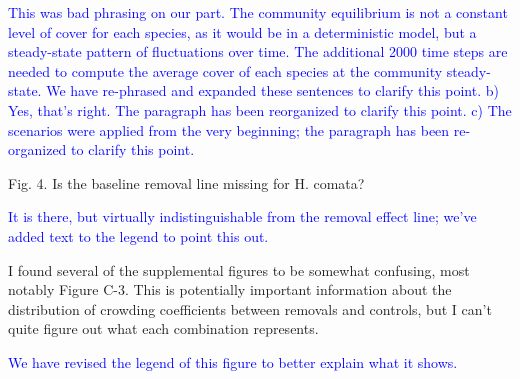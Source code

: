 \documentclass[12pt]{article}
\newcommand{\response}{\textcolor{blue}}
\begin{document}
\response{ This was bad phrasing on our part. 
The community equilibrium is not a constant level of cover for each species, as it would be in a deterministic
model, but a steady-state pattern of fluctuations over time. The additional 2000 time steps are needed to compute the average cover of each species
at the community steady-state. We have re-phrased and expanded these sentences to clarify this point. b) Yes, that's right. The paragraph
has been reorganized to clarify this point. c) The scenarios were applied from the very beginning; the paragraph has been re-organized to 
clarify this point.}

Fig. 4. Is the baseline removal line missing for H. comata?

\response{It is there, but virtually indistinguishable from the removal effect line; we've added text to the legend to point this out.}

I found several of the supplemental figures to be somewhat confusing, most notably Figure C-3. This is
potentially important information about the distribution of crowding coefficients between removals and
controls, but I can’t quite figure out what each combination represents.

\response{We have revised the legend of this figure to better explain what it shows.}
\end{document}
